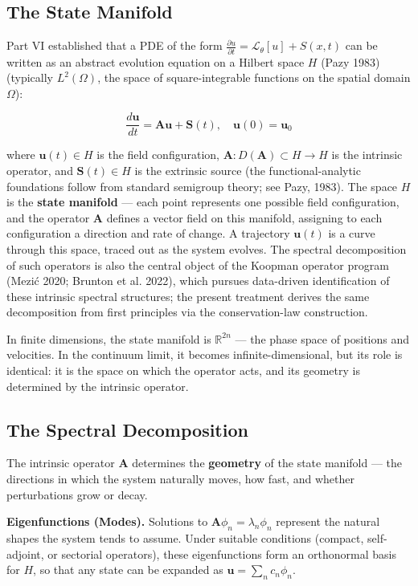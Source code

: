 \documentclass[
  letterpaper,
  DIV=11,
  numbers=noendperiod]{scrartcl}
\begin{document}
\subsection{The State Manifold}\label{the-state-manifold}

Part VI established that a PDE of the form
\(\frac{\partial u}{\partial t} = \mathcal{L}_\theta[u] + S(x,t)\) can
be written as an abstract evolution equation on a Hilbert space \(H\)
(Pazy 1983) (typically \(L^2(\Omega)\), the space of square-integrable
functions on the spatial domain \(\Omega\)):

\[\frac{d\mathbf{u}}{dt} = \mathbf{A}\mathbf{u} + \mathbf{S}(t), \quad \mathbf{u}(0) = \mathbf{u}_0\]

where \(\mathbf{u}(t) \in H\) is the field configuration,
\(\mathbf{A}: D(\mathbf{A}) \subset H \to H\) is the intrinsic operator,
and \(\mathbf{S}(t) \in H\) is the extrinsic source (the
functional-analytic foundations follow from standard semigroup theory;
see Pazy, 1983). The space \(H\) is the \textbf{state manifold} --- each
point represents one possible field configuration, and the operator
\(\mathbf{A}\) defines a vector field on this manifold, assigning to
each configuration a direction and rate of change. A trajectory
\(\mathbf{u}(t)\) is a curve through this space, traced out as the
system evolves. The spectral decomposition of such operators is also the
central object of the Koopman operator program (Mezić 2020; Brunton et
al. 2022), which pursues data-driven identification of these intrinsic
spectral structures; the present treatment derives the same
decomposition from first principles via the conservation-law
construction.

In finite dimensions, the state manifold is \(\mathbb{R}^{2n}\) --- the
phase space of positions and velocities. In the continuum limit, it
becomes infinite-dimensional, but its role is identical: it is the space
on which the operator acts, and its geometry is determined by the
intrinsic operator.

\subsection{The Spectral
Decomposition}\label{the-spectral-decomposition}

The intrinsic operator \(\mathbf{A}\) determines the \textbf{geometry}
of the state manifold --- the directions in which the system naturally
moves, how fast, and whether perturbations grow or decay.

\textbf{Eigenfunctions (Modes).} Solutions to
\(\mathbf{A}\phi_n = \lambda_n\phi_n\) represent the natural shapes the
system tends to assume. Under suitable conditions (compact,
self-adjoint, or sectorial operators), these eigenfunctions form an
orthonormal basis for \(H\), so that any state can be expanded as
\(\mathbf{u} = \sum_n c_n \phi_n\).
\end{document}
